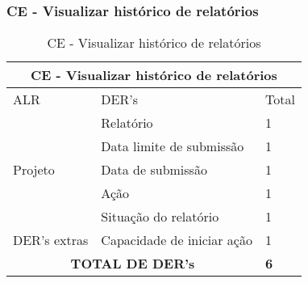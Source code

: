       \vfill
      \pagebreak

  \subsubsection{CE - Visualizar histórico de relatórios}
\begin{table}[!h]
\centering
\caption{CE - Visualizar histórico de relatórios}
\label{ce_visualizar_historico}
\begin{tabular}{|l|l|l|}
\multicolumn{3}{c}{CE - Visualizar histórico de relatórios}          \\ \hline
ALR                      & DER's                      & Total         \\ \hline
\multirow{5}{*}{Projeto} & Relatório                  & 1             \\\cline{2-3}
                         & Data limite de submissão   & 1             \\\cline{2-3}
                         & Data de submissão          & 1             \\\cline{2-3}
                         & Ação                       & 1             \\\cline{2-3}
                         & Situação do relatório      & 1             \\\hline
DER's extras             & Capacidade de iniciar ação & 1             \\\hline
\multicolumn{2}{|c|}{\textbf{TOTAL DE DER's}}                     & \textbf{6} \\ \hline
\end{tabular}
\end{table}



